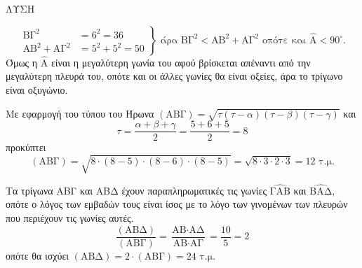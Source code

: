 
ΛΥΣΗ
\begin{alist}
    \item 
    \[ \left. \begin{aligned}
        \text{ΒΓ}^2 &= 6^2 = 36 \\
        \text{ΑΒ}^2 + \text{ΑΓ}^2 &= 5^2 + 5^2 = 50
    \end{aligned} \right\} \text{ άρα } \text{ΒΓ}^2 < \text{ΑΒ}^2 + \text{ΑΓ}^2 \text{ οπότε και } \hat{\text{A}} < 90^\circ. \]
    Όμως η $\hat{\text{A}}$ είναι η μεγαλύτερη γωνία του αφού βρίσκεται απέναντι από την μεγαλύτερη πλευρά του, οπότε και οι άλλες γωνίες θα είναι οξείες, άρα το τρίγωνο είναι οξυγώνιο.
    
    \item 
    Με εφαρμογή του τύπου του Ήρωνα $(\text{ΑΒΓ}) = \sqrt{\tau(\tau-\alpha)(\tau-\beta)(\tau-\gamma)}$ και
    \[ \tau = \frac{\alpha+\beta+\gamma}{2} = \frac{5+6+5}{2} = 8 \]
    προκύπτει
    \[ (\text{ΑΒΓ}) = \sqrt{8 \cdot (8-5) \cdot (8-6) \cdot (8-5)} = \sqrt{8 \cdot 3 \cdot 2 \cdot 3} = 12 \text{ τ.μ.} \]
    
    \item 
    Τα τρίγωνα ΑΒΓ και ΑΒΔ έχουν παραπληρωματικές τις γωνίες $\widehat{\text{ΓΑΒ}}$ και $\widehat{\text{ΒΑΔ}}$, οπότε ο λόγος των εμβαδών τους είναι ίσος με το λόγο των γινομένων των πλευρών που περιέχουν τις γωνίες αυτές.
    \[ \frac{(\text{ΑΒΔ})}{(\text{ΑΒΓ})} = \frac{\text{ΑΒ} \cdot \text{ΑΔ}}{\text{ΑΒ} \cdot \text{ΑΓ}} = \frac{10}{5} = 2 \]
    οπότε θα ισχύει $(\text{ΑΒΔ}) = 2 \cdot (\text{ΑΒΓ}) = 24 \text{ τ.μ.}$
\end{alist}